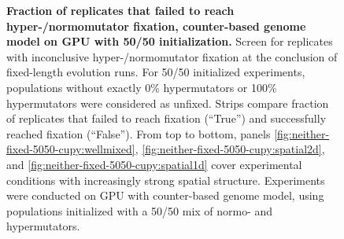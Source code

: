 \begin{figure}[h]
  \begin{minipage}{\textwidth}
    \caption{%
      \textbf{Fraction of replicates that failed to reach hyper-/normomutator fixation, counter-based genome model on GPU with 50/50 initialization.}
      \footnotesize
      Screen for replicates with inconclusive hyper-/normomutator fixation at the conclusion of fixed-length evolution runs.
      For 50/50 initialized experiments, populations without exactly 0\% hypermutators or 100\% hypermutators were considered as unfixed.
      Strips compare fraction of replicates that failed to reach fixation (``True'') and successfully reached fixation (``False'').
      From top to bottom, panels \ref{fig:neither-fixed-5050-cupy:wellmixed}, \ref{fig:neither-fixed-5050-cupy:spatial2d}, and \ref{fig:neither-fixed-5050-cupy:spatial1d} cover experimental conditions with increasingly strong spatial structure.
      Experiments were conducted on GPU with counter-based genome model, using populations initialized with a 50/50 mix of normo- and hypermutators.
}
    \label{fig:neither-fixed-5050-cupy}
  \end{minipage}
\end{figure}
